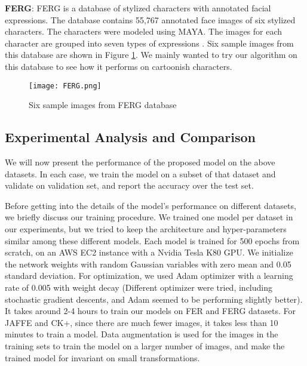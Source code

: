 \documentclass[conference]{IEEEtran}
\begin{document}
\textbf{FERG}:
FERG is a database of stylized characters with annotated facial expressions. The database contains 55,767 annotated face images of six stylized characters. The characters were modeled using MAYA. 
The images for each character are grouped into seven types of expressions \cite{aneja2016modeling}. Six sample images from this database are shown in Figure \ref{fig:FERG}.
We mainly wanted to try our algorithm on this database to see how it performs on cartoonish characters.
\begin{figure}[h]
\begin{center}
   \texttt{[image: FERG.png]}
\end{center}
   \caption{Six sample images from FERG database}
\label{fig:FERG}
\end{figure}


\subsection{Experimental Analysis and Comparison}
We will now present the performance of the proposed model on the above datasets. In each case, we train the model on a subset of that dataset and validate on validation set, and report the accuracy over the test set. 

Before getting into the details of the model's performance on different datasets, we briefly discuss our training procedure.
We trained one model per dataset in our experiments, but we tried to keep the architecture and hyper-parameters similar among these different models. 
Each model is trained for 500 epochs from scratch, on an AWS EC2 instance with a Nvidia Tesla K80 GPU.
We initialize the network weights with random Gaussian variables with zero mean and 0.05 standard deviation. 
For optimization, we used Adam optimizer with a learning rate of 0.005 with weight decay (Different optimizer were tried, including stochastic gradient descents, and Adam seemed to be performing slightly better).
It takes around 2-4 hours to train our models on FER and FERG datasets. For JAFFE and CK+, since there are much fewer images, it takes less than 10 minutes to train a model.
Data augmentation is used for the images in the training sets to train the model on a larger number of images, and make the trained model for invariant on small transformations.
\end{document}
